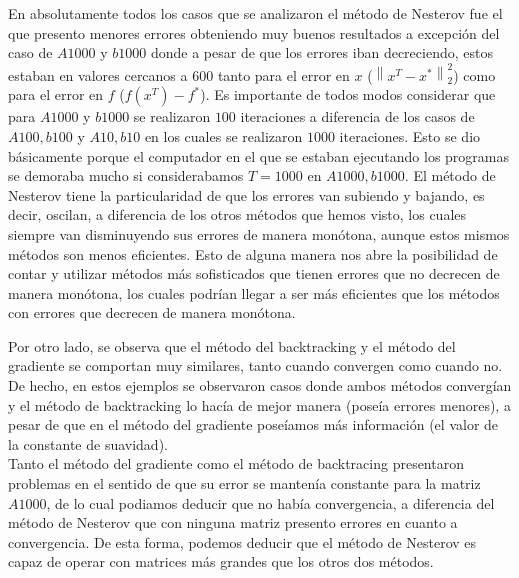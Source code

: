 \documentclass[11pt]{article}
\begin{document}
En absolutamente todos los casos que se analizaron el método de Nesterov fue el que presento menores errores obteniendo muy buenos resultados a excepción del caso de $A1000$ y $b1000$ donde a pesar de que los errores iban decreciendo, estos estaban en valores cercanos a $600$ tanto para el error en $x$ ($\left\| x^T-x^{*} \right\|_2^2$) como para el error en $f$ ($f(x^T)-f^{*}$). Es importante de todos modos considerar que para $A1000$ y $b1000$ se realizaron $100$ iteraciones a diferencia de los casos de $A100,b100$ y $A10,b10$ en los cuales se realizaron $1000$ iteraciones. Esto se dio básicamente porque el computador en el que se estaban ejecutando los programas se demoraba mucho si considerabamos $T=1000$ en $A1000,b1000$. El método de Nesterov tiene la particularidad de que los errores van subiendo y bajando, es decir, oscilan, a diferencia de los otros métodos que hemos visto, los cuales siempre van disminuyendo sus errores de manera monótona, aunque estos mismos métodos son menos eficientes. Esto de alguna manera nos abre la posibilidad de contar y utilizar métodos más sofisticados que tienen errores que no decrecen de manera monótona, los cuales podrían llegar a ser más eficientes que los métodos con errores que decrecen de manera monótona.   \\

\newpage

Por otro lado, se observa que el método del backtracking y el método del gradiente se comportan muy similares, tanto cuando convergen como cuando no. De hecho, en estos ejemplos se observaron casos donde ambos métodos convergían y el método de backtracking lo hacía de mejor manera (poseía errores menores), a pesar de que en el método del gradiente poseíamos más información (el valor de la constante de suavidad). \\

Tanto el método del gradiente como el método de backtracing presentaron problemas en el sentido de que su error se mantenía constante para la matriz $A1000$, de lo cual podiamos deducir que no había convergencia, a diferencia del método de Nesterov que con ninguna matriz presento errores en cuanto a convergencia. De esta forma, podemos deducir que el método de Nesterov es capaz de operar con matrices más grandes que los otros dos métodos.  \\
\end{document}
